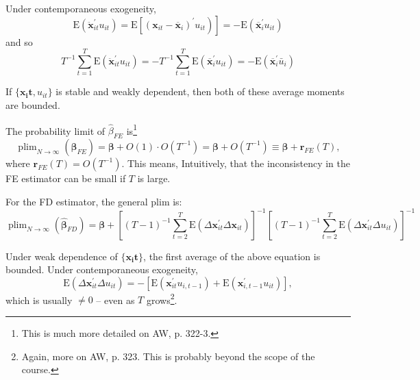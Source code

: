 \documentclass[11pt, a4paper]{report}
\theoremstyle{plain}
\theoremstyle{plain}
\theoremstyle{remark}
\begin{document}
Under contemporaneous exogeneity, 
\begin{equation}
    \left.\mathrm{E}\left(\ddot{\mathbf{x}}_{i t}^{\prime} u_{i t}\right)=\mathrm{E}\left[\left(\mathbf{x}_{i t}-\overline{\mathbf{x}}_{i}\right)^{\prime} u_{i t}\right)\right]=-\mathrm{E}\left(\overline{\mathbf{x}}_{i}^{\prime} u_{i t}\right)
    \end{equation}
and so
\begin{equation}
    T^{-1} \sum_{t=1}^{T} \mathrm{E}\left(\ddot{\mathbf{x}}_{i t}^{\prime} u_{i t}\right)=-T^{-1} \sum_{t=1}^{T} \mathrm{E}\left(\overline{\mathbf{x}}_{i}^{\prime} u_{i t}\right)=-\mathrm{E}\left(\overline{\mathbf{x}}_{i}^{\prime} \bar{u}_{i}\right)
    \end{equation}

If $\{\mathbf{x_it}, u_{it}\}$ is stable and weakly dependent, then both of these average moments are bounded. 

The probability limit of $\hat{\beta}_{FE}$ is\footnote{This is much more detailed on AW, p. 322-3.}
\begin{equation}
    \operatorname{plim}_{N \rightarrow \infty}\left(\hat{\boldsymbol{\beta}}_{F E}\right)=\boldsymbol{\beta}+O(1) \cdot O\left(T^{-1}\right)=\boldsymbol{\beta}+O\left(T^{-1}\right) \equiv \boldsymbol{\beta}+\mathbf{r}_{F E}(T),
    \end{equation}
where $\mathbf{r}_{FE}(T) = O(T^{-1})$. This means, Intuitively, that the inconsistency in the FE estimator can be small if $T$ is large. 

For the FD estimator, the general plim is:
\begin{equation}
    \operatorname{plim}_{N \rightarrow \infty}\left(\hat{\boldsymbol{\beta}}_{F D}\right)=\boldsymbol{\beta}+\left[(T-1)^{-1} \sum_{t=2}^{T} \mathrm{E}\left(\Delta \mathbf{x}_{i t}^{\prime} \Delta \mathbf{x}_{i t}\right)\right]^{-1}\left[(T-1)^{-1} \sum_{t=2}^{T} \mathrm{E}\left(\Delta \mathbf{x}_{i t}^{\prime} \Delta u_{i t}\right)\right]^{-1}
    \end{equation}

Under weak dependence of $\{\mathbf{x_it}\}$, the first average of the above equation is bounded. Under contemporaneous exogeneity, 
\begin{equation}
    \mathrm{E}\left(\Delta \mathbf{x}_{i t}^{\prime} \Delta u_{i t}\right)=-\left[\mathrm{E}\left(\mathbf{x}_{i t}^{\prime} u_{i, t-1}\right)+\mathrm{E}\left(\mathbf{x}_{i, t-1}^{\prime} u_{i t}\right)\right],
    \end{equation}
which is usually $\neq 0$ -- even as $T$ grows\footnote{Again, more on AW, p. 323. This is probably beyond the scope of the course. }. 
\end{document}
